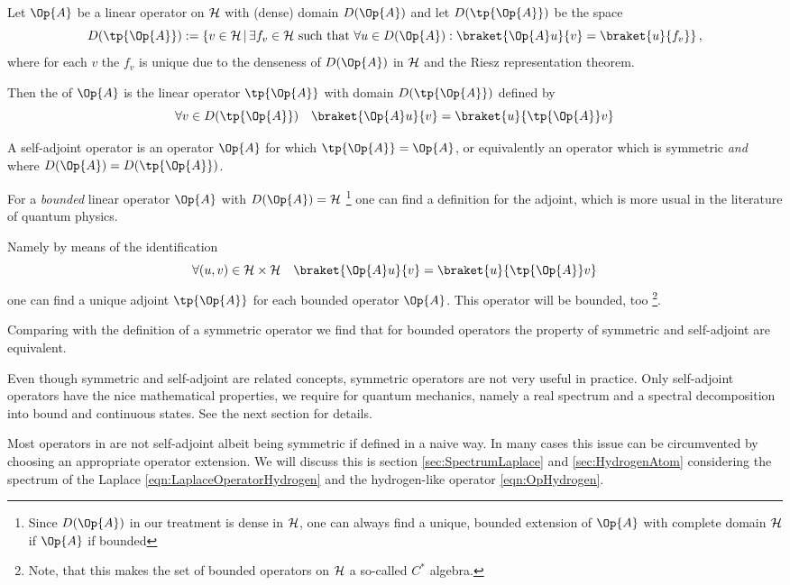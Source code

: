 \begin{defn}
	Let $\Op{A}$ be a linear operator on $\mathcal{H}$ with (dense) domain $D(\Op{A})$
	and let $D(\tp{\Op{A}})$ be the space
	\[ D(\tp{\Op{A}}) := \left\{ v \in \hilbert \, \middle| \,
		\exists f_v \in \hilbert \ \text{such that} \
		\forall u \in D(\Op{A}): \braket{\Op{A} u}{v} = \braket{u}{f_v} \right\},
	\]
	where for each $v$ the $f_v$ is unique due to the denseness
	of $D(\Op{A})$ in $\mathcal{H}$ and the Riesz representation theorem.

	Then the  of $\Op{A}$
	is the linear operator $\tp{\Op{A}}$ with domain $D(\tp{\Op{A}})$
	defined by
	\[ \forall v \in D(\tp{\Op{A}}) \quad \braket{\Op{A} u}{v} = \braket{u}{\tp{\Op{A}} v} \]
\end{defn}

\begin{defn}
	A self-adjoint operator is an operator $\Op{A}$ for which $\tp{\Op{A}} = \Op{A}$,
	or equivalently an operator which is symmetric \emph{and} where
	$D(\Op{A}) = D(\tp{\Op{A}})$.
\end{defn}

\begin{rem}
	For a \emph{bounded} linear operator $\Op{A}$ with $D(\Op{A}) = \hilbert$%
	\footnote{Since $D(\Op{A})$ in our treatment is dense in $\mathcal{H}$,
	one can always find a unique, bounded extension of $\Op{A}$ with complete
	domain $\mathcal{H}$ if $\Op{A}$ if bounded}
	one can find a definition for the adjoint,
	which is more usual in the literature of quantum physics.

	\noindent
	Namely by means of the identification
	\[ \forall (u,v) \in \hilbert \times \hilbert \quad \braket{\Op{A} u}{v} = \braket{u}{\tp{\Op{A}} v} \]
	one can find a unique adjoint $\tp{\Op{A}}$ for each bounded operator $\Op{A}$.
	This operator will be bounded, too%
	\footnote{Note, that this makes the set of bounded operators on $\mathcal{H}$
	a so-called $C^\ast$ algebra.}.

	Comparing with the definition of a symmetric operator we find that for
	bounded operators the property of symmetric and self-adjoint are equivalent.
\end{rem}

\begin{rem}
	Even though symmetric and self-adjoint are related concepts,
	symmetric operators are not very useful in practice.
	Only self-adjoint operators have the nice mathematical properties,
	we require for quantum mechanics, namely a real spectrum
	and a spectral decomposition into bound and continuous states.
	See the next section for details.

	Most operators in \QM are not self-adjoint albeit being symmetric
	if defined in a naive way.
	In many cases this issue can be circumvented
	by choosing an appropriate operator extension.
	We will discuss this 
	is section \vref{sec:SpectrumLaplace} and \vref{sec:HydrogenAtom}
	considering the spectrum of the Laplace \eqref{eqn:LaplaceOperatorHydrogen}
	and the hydrogen-like operator \eqref{eqn:OpHydrogen}.
\end{rem}

